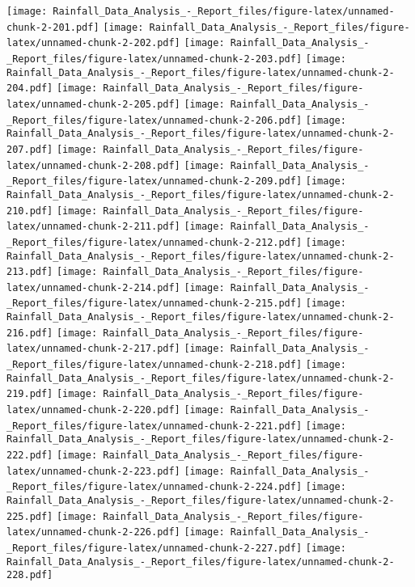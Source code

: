 \documentclass[
]{article}
\begin{document}
\texttt{[image: Rainfall\_Data\_Analysis\_-\_Report\_files/figure-latex/unnamed-chunk-2-201.pdf]}
\texttt{[image: Rainfall\_Data\_Analysis\_-\_Report\_files/figure-latex/unnamed-chunk-2-202.pdf]}
\texttt{[image: Rainfall\_Data\_Analysis\_-\_Report\_files/figure-latex/unnamed-chunk-2-203.pdf]}
\texttt{[image: Rainfall\_Data\_Analysis\_-\_Report\_files/figure-latex/unnamed-chunk-2-204.pdf]}
\texttt{[image: Rainfall\_Data\_Analysis\_-\_Report\_files/figure-latex/unnamed-chunk-2-205.pdf]}
\texttt{[image: Rainfall\_Data\_Analysis\_-\_Report\_files/figure-latex/unnamed-chunk-2-206.pdf]}
\texttt{[image: Rainfall\_Data\_Analysis\_-\_Report\_files/figure-latex/unnamed-chunk-2-207.pdf]}
\texttt{[image: Rainfall\_Data\_Analysis\_-\_Report\_files/figure-latex/unnamed-chunk-2-208.pdf]}
\texttt{[image: Rainfall\_Data\_Analysis\_-\_Report\_files/figure-latex/unnamed-chunk-2-209.pdf]}
\texttt{[image: Rainfall\_Data\_Analysis\_-\_Report\_files/figure-latex/unnamed-chunk-2-210.pdf]}
\texttt{[image: Rainfall\_Data\_Analysis\_-\_Report\_files/figure-latex/unnamed-chunk-2-211.pdf]}
\texttt{[image: Rainfall\_Data\_Analysis\_-\_Report\_files/figure-latex/unnamed-chunk-2-212.pdf]}
\texttt{[image: Rainfall\_Data\_Analysis\_-\_Report\_files/figure-latex/unnamed-chunk-2-213.pdf]}
\texttt{[image: Rainfall\_Data\_Analysis\_-\_Report\_files/figure-latex/unnamed-chunk-2-214.pdf]}
\texttt{[image: Rainfall\_Data\_Analysis\_-\_Report\_files/figure-latex/unnamed-chunk-2-215.pdf]}
\texttt{[image: Rainfall\_Data\_Analysis\_-\_Report\_files/figure-latex/unnamed-chunk-2-216.pdf]}
\texttt{[image: Rainfall\_Data\_Analysis\_-\_Report\_files/figure-latex/unnamed-chunk-2-217.pdf]}
\texttt{[image: Rainfall\_Data\_Analysis\_-\_Report\_files/figure-latex/unnamed-chunk-2-218.pdf]}
\texttt{[image: Rainfall\_Data\_Analysis\_-\_Report\_files/figure-latex/unnamed-chunk-2-219.pdf]}
\texttt{[image: Rainfall\_Data\_Analysis\_-\_Report\_files/figure-latex/unnamed-chunk-2-220.pdf]}
\texttt{[image: Rainfall\_Data\_Analysis\_-\_Report\_files/figure-latex/unnamed-chunk-2-221.pdf]}
\texttt{[image: Rainfall\_Data\_Analysis\_-\_Report\_files/figure-latex/unnamed-chunk-2-222.pdf]}
\texttt{[image: Rainfall\_Data\_Analysis\_-\_Report\_files/figure-latex/unnamed-chunk-2-223.pdf]}
\texttt{[image: Rainfall\_Data\_Analysis\_-\_Report\_files/figure-latex/unnamed-chunk-2-224.pdf]}
\texttt{[image: Rainfall\_Data\_Analysis\_-\_Report\_files/figure-latex/unnamed-chunk-2-225.pdf]}
\texttt{[image: Rainfall\_Data\_Analysis\_-\_Report\_files/figure-latex/unnamed-chunk-2-226.pdf]}
\texttt{[image: Rainfall\_Data\_Analysis\_-\_Report\_files/figure-latex/unnamed-chunk-2-227.pdf]}
\texttt{[image: Rainfall\_Data\_Analysis\_-\_Report\_files/figure-latex/unnamed-chunk-2-228.pdf]}
\end{document}
